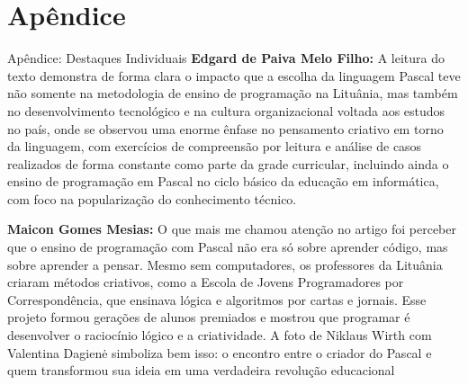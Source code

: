 \documentclass{beamer}
\begin{document}
\section{Apêndice}
\begin{frame}{Apêndice: Destaques Individuais}
\textbf{Edgard de Paiva Melo Filho:} A leitura do texto demonstra de forma clara o impacto que a escolha da linguagem Pascal teve não somente na metodologia de ensino de programação na Lituânia, mas também no desenvolvimento tecnológico e na cultura organizacional voltada aos estudos no país, onde se observou uma enorme ênfase no pensamento criativo em torno da linguagem, com exercícios de compreensão por leitura e análise de casos realizados de forma constante como parte da grade curricular, incluindo ainda o ensino de programação em Pascal no ciclo básico da educação em informática, com foco na popularização do conhecimento técnico.
\end{frame}
\begin{frame}
\textbf{Maicon Gomes Mesias:} O que mais me chamou atenção no artigo foi perceber que o ensino de programação com Pascal não era só sobre aprender código, mas sobre aprender a pensar.
Mesmo sem computadores, os professores da Lituânia criaram métodos criativos, como a Escola de Jovens Programadores por Correspondência, que ensinava lógica e algoritmos por cartas e jornais.
Esse projeto formou gerações de alunos premiados e mostrou que programar é desenvolver o raciocínio lógico e a criatividade.
A foto de Niklaus Wirth com Valentina Dagienė simboliza bem isso: o encontro entre o criador do Pascal e quem transformou sua ideia em uma verdadeira revolução educacional
\end{frame}
\end{document}
